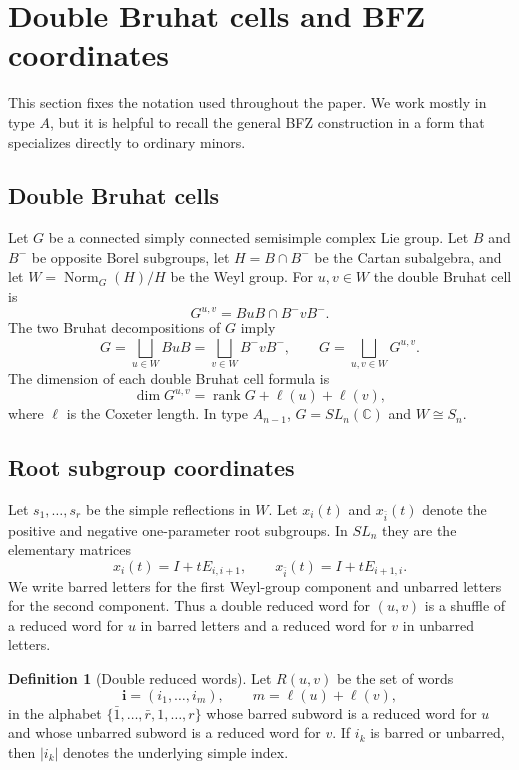 \documentclass[12pt]{amsart}
\newcommand{\C}{\mathbb C}
\newcommand{\bi}{\mathbf i}
\theoremstyle{plain}
\theoremstyle{definition}
\newtheorem{definition}[theorem]{Definition}
\theoremstyle{remark}
\begin{document}
\section{Double Bruhat cells and BFZ coordinates}\label{sec:background}

This section fixes the notation used throughout the paper.  We work mostly in type $A$, but it is helpful to recall the general BFZ construction in a form that specializes directly to ordinary minors.

\subsection{Double Bruhat cells}

Let $G$ be a connected simply connected semisimple complex Lie group.  Let $B$ and $B^-$ be opposite Borel subgroups, let $H=B\cap B^-$ be the Cartan subalgebra, and let $W=\operatorname{Norm}_G(H)/H$ be the Weyl group.  For $u,v\in W$ the double Bruhat cell is
\[
   G^{u,v}=BuB\cap B^-vB^-.
\]
The two Bruhat decompositions of $G$ imply
\[
   G=\bigsqcup_{u\in W}BuB
    =\bigsqcup_{v\in W}B^-vB^-,
   \qquad
   G=\bigsqcup_{u,v\in W}G^{u,v}.
\]
The dimension of each double Bruhat cell formula is
\[
   \dim G^{u,v}=\operatorname{rank}G+\ell(u)+\ell(v),
\]
where $\ell$ is the Coxeter length.  In type $A_{n-1}$, $G=SL_n(\C)$ and $W\cong S_n$.

\subsection{Root subgroup coordinates}

Let $s_1,\ldots,s_r$ be the simple reflections in $W$.  Let $x_i(t)$ and $x_{\bar i}(t)$ denote the positive and negative one-parameter root subgroups.  In $SL_n$ they are the elementary matrices
\[
   x_i(t)=I+tE_{i,i+1},
   \qquad
   x_{\bar i}(t)=I+tE_{i+1,i}.
\]
We write barred letters for the first Weyl-group component and unbarred letters for the second component.  Thus a double reduced word for $(u,v)$ is a shuffle of a reduced word for $u$ in barred letters and a reduced word for $v$ in unbarred letters.

\begin{definition}[Double reduced words]
Let $R(u,v)$ be the set of words
\[
   \bi=(i_1,\ldots,i_m),\qquad m=\ell(u)+\ell(v),
\]
in the alphabet $\{\bar1,\ldots,\bar r,1,\ldots,r\}$ whose barred subword is a reduced word for $u$ and whose unbarred subword is a reduced word for $v$.  If $i_k$ is barred or unbarred, then $|i_k|$ denotes the underlying simple index.
\end{definition}
\end{document}
